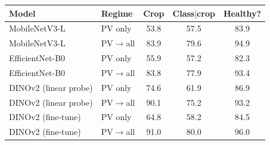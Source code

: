 \begin{tabular}{llccc}\toprule
Model & Regime & Crop & Class$\mid$crop & Healthy? \\\midrule
MobileNetV3-L & PV only & 53.8 & 57.5 & 83.9 \\
MobileNetV3-L & PV$\rightarrow$all & 83.9 & 79.6 & 94.9 \\
EfficientNet-B0 & PV only & 55.9 & 57.2 & 82.3 \\
EfficientNet-B0 & PV$\rightarrow$all & 83.8 & 77.9 & 93.4 \\
DINOv2 (linear probe) & PV only & 74.6 & 61.9 & 86.9 \\
DINOv2 (linear probe) & PV$\rightarrow$all & 90.1 & 75.2 & 93.2 \\
DINOv2 (fine-tune) & PV only & 64.8 & 58.2 & 84.5 \\
DINOv2 (fine-tune) & PV$\rightarrow$all & 91.0 & 80.0 & 96.0 \\
\bottomrule\end{tabular}
